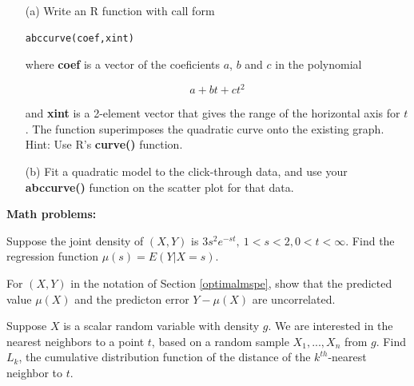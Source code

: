 \begin{itemize}

\item [(a)]
Write an R function with call form

\begin{lstlisting}
abccurve(coef,xint)
\end{lstlisting}

where {\bf coef} is a vector of the coeficients $a$, $b$ and $c$ in the
polynomial

\begin{equation}
a + b t + c t^2
\end{equation}

and {\bf xint} is a 2-element vector that gives the range of the
horizontal axis for $t$.  The function superimposes the quadratic curve
onto the existing graph.  Hint:  Use R's {\bf curve()} function.

\item [(b)]
Fit a quadratic model to the click-through data, and use your {\bf
abccurve()} function on the scatter plot for that data.

\end{itemize}

{\bf Math problems:}

\oneproblem
Suppose the joint density of $(X,Y)$ is $3s^2 e^{-st}, ~ 1 < s < 2, 0 < t
< \infty$.  Find the regression function $\mu(s) = E(Y | X = s)$.

\oneproblem
For $(X,Y)$ in the notation of Section \ref{optimalmspe}, show that the 
predicted value $\mu(X)$ and the predicton error $Y - \mu(X)$ are
uncorrelated.

\oneproblem
Suppose $X$ is a scalar random variable with density $g$.  We are
interested in the nearest neighbors to a point $t$, based on a random
sample $X_1,...,X_n$ from $g$.  Find $L_k$, the cumulative
distribution function of the distance of the $k^{th}$-nearest neighbor
to $t$.

